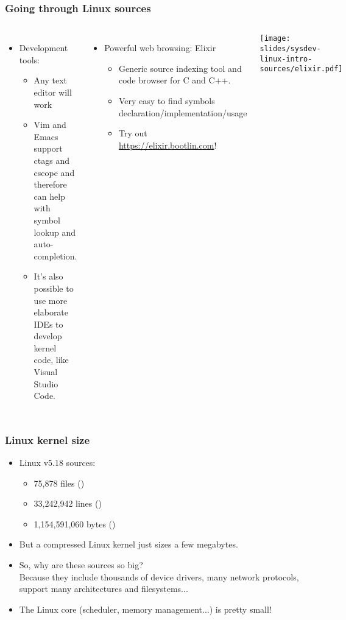 \begin{frame}
  \frametitle{Going through Linux sources}
  \begin{columns}
    \begin{itemize}
    \item Development tools:
      \begin{itemize}
      \item Any text editor will work
      \item Vim and Emacs support ctags and cscope and therefore can help
        with symbol lookup and auto-completion.
      \item It's also possible to use more elaborate IDEs to develop
        kernel code, like Visual Studio Code.
      \end{itemize}
    \end{itemize}
    \begin{itemize}
    \item Powerful web browsing: Elixir
      \begin{itemize}
      \item Generic source indexing tool and code browser for C and C++.
      \item Very easy to find symbols declaration/implementation/usage
      \item Try out \url{https://elixir.bootlin.com}!
      \end{itemize}
    \end{itemize}
    \begin{center}
      \texttt{[image: slides/sysdev-linux-intro-sources/elixir.pdf]}
    \end{center}
  \end{columns}
\end{frame}

\begin{frame}
  \frametitle{Linux kernel size}
  \begin{itemize}
  \item Linux v5.18 sources:\\
    \begin{itemize}
	\item 75,878 files ()
	\item 33,242,942 lines ()
	\item 1,154,591,060 bytes ()
    \end{itemize}
  \item But a compressed Linux kernel just sizes a few megabytes.
  \item So, why are these sources so big?\\
    Because they include thousands of device drivers, many network
    protocols, support many architectures and filesystems...
  \item The Linux core (scheduler, memory management...) is pretty
    small!
  \end{itemize}
\end{frame}

